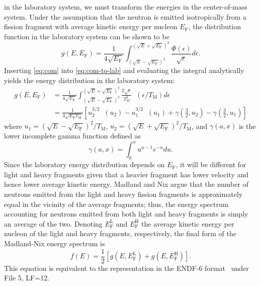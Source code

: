 \documentclass[final,leqno,onefignum,onetabnum]{siamltex1213}
\DeclareMathOperator\expint{E_1}
\newcommand{\tmax}{T_{\mathrm{M}}}
\newcommand{\ef}{E_{\mathrm{F}}}
\newcommand{\efl}{E_{\mathrm{F}}^{\mathrm{L}}}
\newcommand{\efh}{E_{\mathrm{F}}^{\mathrm{H}}}
\begin{document}
in the laboratory system, we must transform the energies in the center-of-mass
system. Under the assumption that the neutron is emitted isotropically from a
fission fragment with average kinetic energy per nucleon $\ef$, the distribution
function in the laboratory system can be shown to be~\cite{physrev-terrell-1959}
\begin{equation}
  g(E,\ef) = \frac{1}{4\sqrt{\ef}} \int_{\left( \sqrt{E} - \sqrt{\ef}
    \right)^2}^{\left( \sqrt{E} + \sqrt{\ef} \right)^2}
  \frac{\Phi(\epsilon)}{\sqrt{\epsilon}} d\epsilon.
  \label{eq:com-to-lab}
\end{equation}
Inserting \eqref{eq:com} into \eqref{eq:com-to-lab} and evaluating the integral
analytically yields the energy distribution in the laboratory system:
\begin{align*}
  g(E,\ef) &= \frac{1}{4\sqrt{\ef}} \int_{\left( \sqrt{E} - \sqrt{\ef}
    \right)^2}^{\left( \sqrt{E} + \sqrt{\ef} \right)^2}
  \frac{2\sqrt{\epsilon}}{\tmax^2} \expint(\epsilon/\tmax) d\epsilon \\ &=
  \frac{1}{3\sqrt{\ef \tmax}} \left [ u_2^{3/2} \expint (u_2) - u_1^{3/2} \expint
    (u_1) + \gamma \left( \frac{3}{2}, u_2 \right ) - \gamma \left( \frac{3}{2},
    u_1 \right) \right ]
\end{align*}
where $u_1 = \left ( \sqrt{E} - \sqrt{\ef} \right )^2/\tmax$, $u_2 = \left (
\sqrt{E} + \sqrt{\ef} \right)^2/\tmax$, and $\gamma(a,x)$ is the lower incomplete
gamma function defined as
\begin{equation*}
  \gamma(a,x) = \int_0^x u^{a-1} e^{-u} du.
\end{equation*}
Since the laboratory energy distribution depends on $\ef$, it will be different
for light and heavy fragments given that a heavier fragment has lower velocity
and hence lower average kinetic energy. Madland and Nix argue that the number of
neutrons emitted from the light and heavy fission fragments is approximately
equal in the vicinity of the average fragments; thus, the energy spectrum
accounting for neutrons emitted from both light and heavy fragments is simply an
average of the two. Denoting $\efl$ and $\efh$ the average kinetic energy per
nucleon of the light and heavy fragments, respectively, the final form of the
Madland-Nix energy spectrum is
\begin{equation}
  \label{eq:spectrum}
  f(E) = \frac{1}{2} \left [ g(E, \efl) + g(E, \efh) \right ].
\end{equation}
This equation is equivalent to the representation in the ENDF-6
format~\cite{bnl-trkov-2012} under File 5, LF=12.
\end{document}
